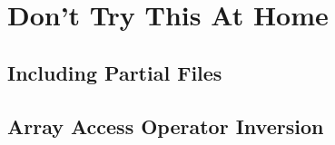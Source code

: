 \documentclass[../main.tex]{subfiles}
\begin{document}
\chapter{Don't Try This At Home}
\section{Including Partial Files}
\section{Array Access Operator Inversion}
\end{document}
